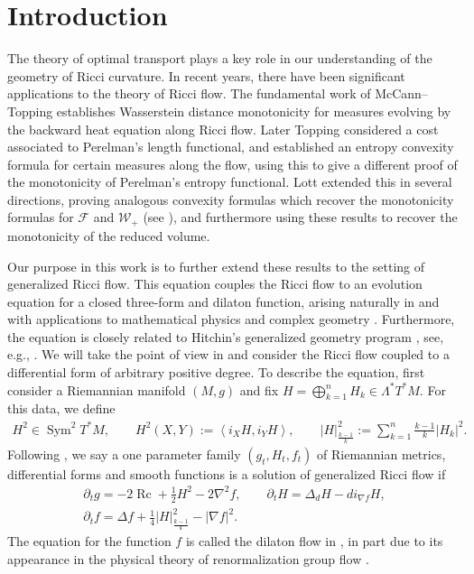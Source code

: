 \documentclass[11pt]{article}
\numberwithin{equation}{section}
\numberwithin{equation}{section}
\newcommand{\del}{\partial}
\newcommand{\N}{\nabla}
\newcommand{\FF}{\mathcal F}
\newcommand{\WW}{\mathcal W}
\newcommand{\IP}[1]{\left<#1\right>}
\newcommand{\wwnorm}[1]{\left|#1\right|^2_{\frac{k-1}k}}
\DeclareMathOperator{\Sym}{Sym}
\DeclareMathOperator{\Rc}{Rc}
\begin{document}
\section{Introduction}

The theory of optimal transport plays a key role in our understanding of the geometry of Ricci curvature. In recent years, there have been significant applications to the theory of Ricci flow. The fundamental work of McCann--Topping \cite{McCannTopping} establishes Wasserstein distance monotonicity for measures evolving by the backward heat equation along Ricci flow. Later Topping \cite{ToppingOT} considered a cost associated to Perelman's length functional, and established an entropy convexity formula for certain measures along the flow, using this to give a different proof of the monotonicity of Perelman's entropy functional. Lott \cite{LottOTPRV} extended this in several directions, proving analogous convexity formulas which recover the monotonicity formulas for $\FF$ and $\WW_+$ (see \cite{FIN, Perelman1}), and furthermore using these results to recover the monotonicity of the reduced volume.

Our purpose in this work is to further extend these results to the setting of generalized Ricci flow. This equation couples the Ricci flow to an evolution equation for a closed three-form and dilaton function, arising naturally in and with applications to mathematical physics \cite{HeLiuGRF,OSW,Polchinski,StreetsTdual} and complex geometry \cite{JFS, StreetsPCFBI, PCF}. Furthermore, the equation is closely related to Hitchin's generalized geometry program \cite{AXu,GualtieriGKG,HitchinGCY}, see, e.g., \cite{MGFRicciflowTdual, GRFbook, GKRF}. We will take the point of view in \cite{Streetsscalar} and consider the Ricci flow coupled to a differential form of arbitrary positive degree. To describe the equation, first consider a Riemannian manifold $(M, g)$ and fix $H=\bigoplus_{k=1}^n H_k\in\Lambda^*T^*M$. For this data, we define
\begin{align*}
 H^2 \in \Sym^2 T^*M,\qquad H^2(X,Y) := \IP{i_X H, i_Y H}, \qquad \wwnorm{H}:= \sum_{k=1}^n\frac{k-1}k|H_k|^2.
\end{align*}
Following \cite{Streetsscalar}, we say a one parameter family $(g_t, H_t, f_t)$ of Riemannian metrics, differential forms and smooth functions is a solution of generalized Ricci flow if
\begin{gather*}
\del_tg= -2 \Rc + \frac12 H^2- 2 \N^2 f,\qquad
\del_t H= \Delta_dH-d i_{\N f}H,\\
\del_t f= \Delta f+\frac14 \wwnorm{H}-|\N f|^2.
\end{gather*}
The equation for the function $f$ is called the dilaton flow in \cite{Streetsscalar}, in part due to its appearance in the physical theory of renormalization group flow \cite{Polchinski}.
\end{document}
